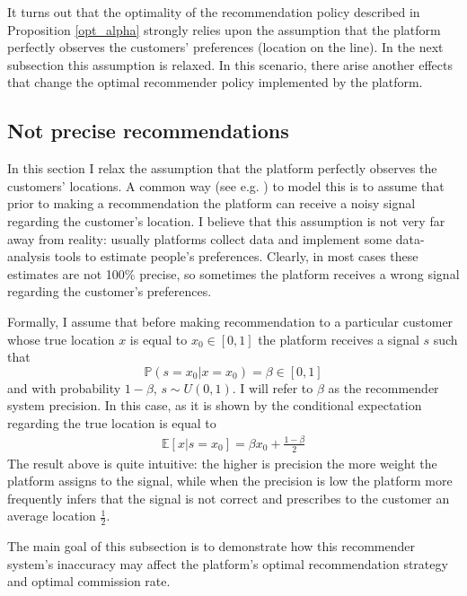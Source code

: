 \documentclass[a4paper]{article}
\begin{document}
It turns out that the optimality of the recommendation policy described in Proposition \ref{opt_alpha} strongly relies upon the assumption that the platform perfectly observes the customers' preferences (location on the line). In the next subsection this assumption is relaxed. In this scenario, there arise another effects that change the optimal recommender policy implemented by the platform.

\subsection{Not precise recommendations}
In this section I relax the assumption that the platform perfectly observes the customers' locations. A common way (see e.g. \cite{lewis1994supplying} ) to model this is to assume that prior to making a recommendation the platform can receive a noisy signal regarding the customer's location. I believe that this assumption is not very far away from reality: usually platforms collect data and implement some data-analysis tools to estimate people's preferences. Clearly, in most cases these estimates are not 100\% precise, so sometimes the platform receives a wrong signal regarding the customer's preferences.




Formally, I assume that before making recommendation to a particular customer whose true location $x$ is equal to $x_0 \in [0, 1]$ the platform receives a signal $s$ such that $$\mathbb{P}(s=x_0|x=x_0) = \beta \in [0, 1]$$ and with probability $1-\beta$, $s \sim U(0, 1)$. I will refer to $\beta$ as the recommender system precision. In this case, as it is shown by \cite{li2018recommender} the conditional expectation regarding the true location is equal to \begin{align}\label{signal}
\mathbb{E}[x|s=x_0] = \beta x_0 + \frac{1-\beta}{2}
\end{align}
The result above is quite intuitive: the higher is precision the more weight the platform assigns to the signal, while when the precision is low the platform more frequently infers that the signal is not correct and prescribes to the customer an average location $\frac{1}{2}$. 


The main goal of this subsection is to demonstrate how this recommender system's inaccuracy may affect the platform's optimal recommendation strategy and optimal commission rate.
\end{document}
